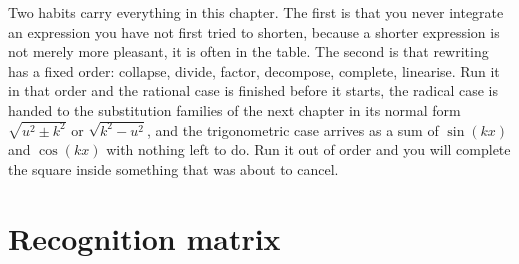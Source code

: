 Two habits carry everything in this chapter. The first is that you never integrate an expression you have not first tried to shorten, because a shorter expression is not merely more pleasant, it is often in the table. The second is that rewriting has a fixed order: collapse, divide, factor, decompose, complete, linearise. Run it in that order and the rational case is finished before it starts, the radical case is handed to the substitution families of the next chapter in its normal form $\sqrt{u^2\pm k^2}$ or $\sqrt{k^2-u^2}$, and the trigonometric case arrives as a sum of $\sin(kx)$ and $\cos(kx)$ with nothing left to do. Run it out of order and you will complete the square inside something that was about to cancel.

\section{Recognition matrix}
